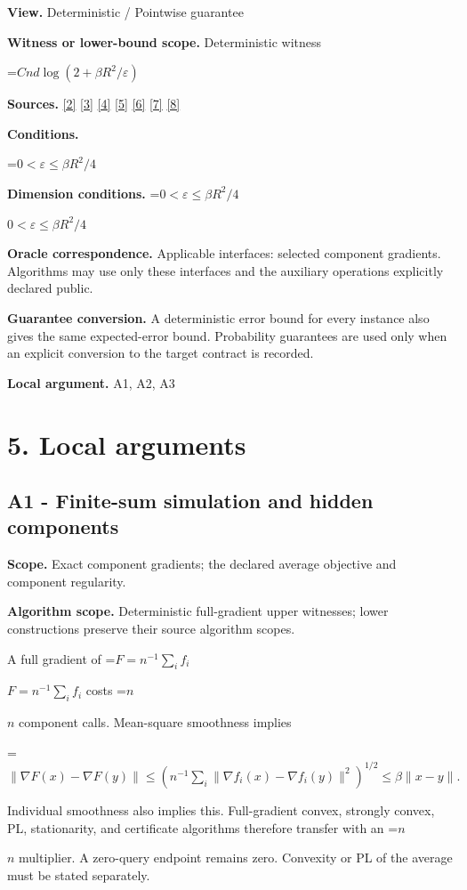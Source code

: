 \documentclass[10pt,a4paper]{article}
\newcommand{\AtlasMath}[1]{\par\begingroup\centering\setbox0=\hbox{$\displaystyle #1$}\ifdim\wd0>1.4\linewidth\typeout{ATLAS WIDE FORMULA: \the\wd0}\fi\ifdim\wd0>\linewidth\resizebox{\linewidth}{!}{\box0}\else\box0\fi\par\endgroup}
\newcommand{\AtlasInlineMath}[1]{\begingroup\setbox0=\hbox{$#1$}\ifdim\wd0>.4\linewidth\endgroup\AtlasMath{#1}\else\endgroup$#1$\fi}
\begin{document}
\textbf{View.} Deterministic / Pointwise guarantee

\textbf{Witness or lower-bound scope.} Deterministic witness

\AtlasMath{Cnd\log(2+\beta R^2/\varepsilon)}
\textbf{Sources.} \href{https://proceedings.mlr.press/v97/zhou19b/zhou19b.pdf}{[2]} \href{https://arxiv.org/pdf/1405.4980}{[3]} \href{https://arxiv.org/pdf/2101.09740v2}{[4]} \href{https://arxiv.org/pdf/2609.33360v2}{[5]} \href{https://arxiv.org/pdf/2609.10874}{[6]} \href{https://www2.isye.gatech.edu/~nemirovs/MOR_AccuracyCertificates.pdf}{[7]} \href{https://arxiv.org/pdf/2609.20701}{[8]}

\textbf{Conditions.} 
\AtlasMath{0<\varepsilon\le\beta R^2/4}


\textbf{Dimension conditions.} \AtlasInlineMath{0<\varepsilon\le\beta R^2/4}

\textbf{Oracle correspondence.} Applicable interfaces: selected component gradients. Algorithms may use only these interfaces and the auxiliary operations explicitly declared public.

\textbf{Guarantee conversion.} A deterministic error bound for every instance also gives the same expected-error bound. Probability guarantees are used only when an explicit conversion to the target contract is recorded.

\textbf{Local argument.} A1, A2, A3

\section{5. Local arguments}
\subsection{A1 - Finite-sum simulation and hidden components}
\textbf{Scope.} Exact component gradients; the declared average objective and component regularity.

\textbf{Algorithm scope.} Deterministic full-gradient upper witnesses; lower constructions preserve their source algorithm scopes.

A full gradient of \AtlasInlineMath{F=n^{-1}\sum_i f_i} costs \AtlasInlineMath{n} component calls. Mean-square smoothness implies

\AtlasMath{\|\nabla F(x)-\nabla F(y)\|
\le(n^{-1}\sum_i\|\nabla f_i(x)-\nabla f_i(y)\|^2)^{1/2}
\le\beta\|x-y\|.}

Individual smoothness also implies this. Full-gradient convex, strongly convex, PL, stationarity, and certificate algorithms therefore transfer with an \AtlasInlineMath{n} multiplier. A zero-query endpoint remains zero. Convexity or PL of the average must be stated separately.
\end{document}
